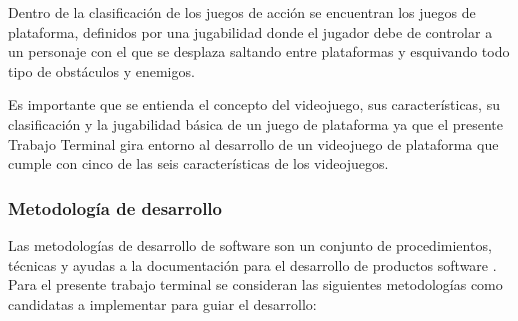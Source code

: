 Dentro de la clasificación de los juegos de acción se encuentran los juegos de 
plataforma,
definidos por una jugabilidad donde el jugador debe de controlar a un personaje
con el que se desplaza saltando entre plataformas y esquivando todo tipo de
obstáculos y enemigos\cite{Ref_JuegoDisenio}.
\\
\par 
Es importante que se entienda el concepto del videojuego, sus características,
su clasificación y la jugabilidad básica de un juego de plataforma ya que el
presente Trabajo Terminal gira entorno al desarrollo de un videojuego de 
plataforma que cumple con cinco de las seis características de los videojuegos.

\subsubsection{Metodología de desarrollo}
Las metodologías de desarrollo de software son un conjunto de procedimientos,
técnicas y ayudas a la documentación para el desarrollo de productos software
\cite{Ref_metodologia}. Para el presente trabajo terminal se consideran las
siguientes metodologías como candidatas a implementar para guiar el desarrollo:

